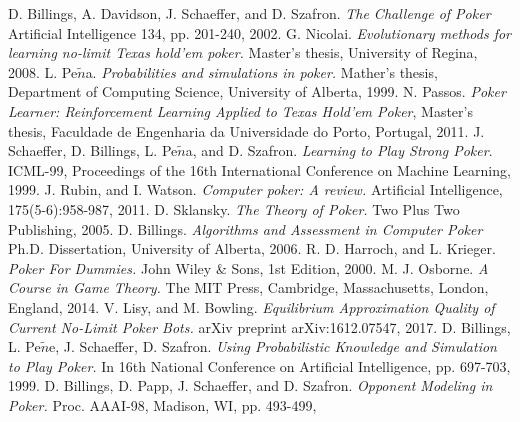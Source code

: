 
\begin{thebibliography}{9}
D. Billings, A. Davidson, J. Schaeffer, and D. Szafron.
\textit{The Challenge of Poker}
Artificial Intelligence 134, pp. 201-240, 2002.
G. Nicolai.
\textit{Evolutionary methods for learning no-limit Texas hold'em poker.} Master's thesis, University of Regina, 2008.
  L. Pe$\tilde{n}$a.
  \textit{Probabilities and simulations in poker.}
  Mather's thesis, Department of Computing Science, University of Alberta,
  1999.
  N. Passos.
  \textit{Poker Learner: Reinforcement Learning Applied to Texas Hold'em Poker},
  Master's thesis, Faculdade de Engenharia da Universidade do Porto, Portugal, 
  2011.
  \href{https://paginas.fe.up.pt/$\sim$ei08029/Master\%20Thesis\%20-\%20Nuno\%20Passos.pdf}{}
   J. Schaeffer, D. Billings, L. Pe$\tilde{n}$a, and D. Szafron.
  \textit{Learning to Play Strong Poker}.
  ICML-99, Proceedings of the 16th International Conference on Machine Learning, 
  1999.
  \href{http://poker.cs.ualberta.ca/publications/ICML99.pdf}{}
  J. Rubin, and I. Watson.
  \textit{Computer poker: A review.}
   Artificial Intelligence, 175(5-6):958-987,
  2011.
  D. Sklansky.
  \textit{The Theory of Poker.}
   Two Plus Two Publishing,
  2005.
  D. Billings.
  \textit{Algorithms and Assessment in Computer Poker}
   Ph.D. Dissertation, University of Alberta,
  2006.
  R. D. Harroch, and L. Krieger.
  \textit{Poker For Dummies.}
   John Wiley \& Sons, 1st Edition,
  2000.
  M. J. Osborne.
  \textit{A Course in Game Theory.}
   The MIT Press, Cambridge, Massachusetts, London, England,
  2014.
  V. Lisy, and M. Bowling.
  \textit{Equilibrium Approximation Quality of Current No-Limit Poker Bots.}
   arXiv preprint arXiv:1612.07547,
  2017.
  D. Billings, L. Pe$\tilde{n}$e, J. Schaeffer, D. Szafron.
  \textit{Using Probabilistic Knowledge and Simulation to Play Poker.}
   In 16th National Conference on Artificial
Intelligence, pp. 697-703,
  1999.
  D. Billings, D. Papp, J. Schaeffer, and D. Szafron.
  \textit{Opponent Modeling in Poker.}
   Proc. AAAI-98, Madison, WI, pp. 493-499,

\end{thebibliography}
